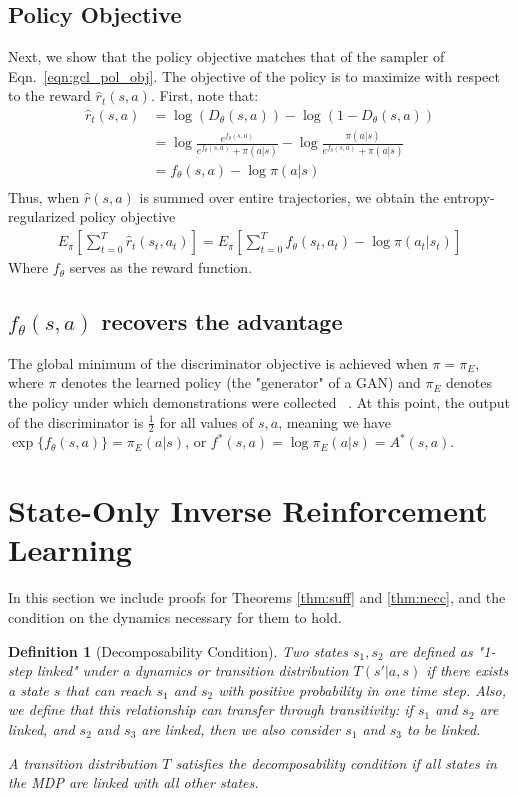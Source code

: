 \documentclass{article} \usepackage{iclr2018_conference,times}
\newtheorem{definition}{Definition}[section]
\begin{document}
\subsection{Policy Objective}
Next, we show that the policy objective matches that of the sampler of Eqn.~\ref{eqn:gcl_pol_obj}. The objective of the policy is to maximize with respect to the reward $\hat{r}_t(s,a)$. First, note that:
\begin{align*}
\hat{r}_t(s,a) &= \log(D_\theta(s,a)) - \log(1-D_\theta(s,a)) \\
&= \log\frac{e^{f_\theta(s,a)}}{e^{f_\theta(s,a)}+\pi(a|s)}
-\log\frac{\pi(a|s)}{e^{f_\theta(s,a)}+ \pi(a|s)} \\ 
&= f_\theta(s,a) - \log \pi(a|s) \\ 
\end{align*}
Thus, when $\hat{r}(s,a)$ is summed over entire trajectories, we obtain the entropy-regularized policy objective
\begin{align*}
E_{\pi}\left[\sum_{t=0}^T \hat{r}_t(s_t, a_t)\right] = 
E_{\pi}\left[\sum_{t=0}^T f_\theta(s_t,a_t) - \log \pi(a_t|s_t)\right]
\end{align*}
Where $f_\theta$ serves as the reward function.

\subsection{$f_\theta(s,a)$ recovers the advantage}
\label{app:airl_advantage}
The global minimum of the discriminator objective is achieved when $\pi = \pi_E$, where $\pi$ denotes the learned policy (the "generator" of a GAN) and $\pi_E$ denotes the policy under which demonstrations were collected ~\citep{gan-goodfellow}. At this point, the output of the discriminator is $\frac{1}{2}$ for all values of $s,a$, meaning we have  $\exp\{f_\theta(s,a)\}= \pi_E(a|s)$, or $f^*(s,a) = \log \pi_E(a|s) = A^*(s,a)$.

\section{State-Only Inverse Reinforcement Learning}
\label{app:state_only}
In this section we include proofs for Theorems \ref{thm:suff} and \ref{thm:necc}, and the condition on the dynamics necessary for them to hold.

\begin{definition}[Decomposability Condition]
Two states $s_1, s_2$ are defined as "1-step linked" under a dynamics or transition distribution $T(s'|a,s)$ if there exists a state $s$ that can reach $s_1$ and $s_2$ with positive probability in one time step. Also, we define that this relationship can transfer through transitivity: if $s_1$ and $s_2$ are linked, and $s_2$ and $s_3$ are linked, then we also consider $s_1$ and $s_3$ to be linked.

A transition distribution $T$ satisfies the decomposability condition if all states in the MDP are linked with all other states.
\end{definition}
\end{document}
